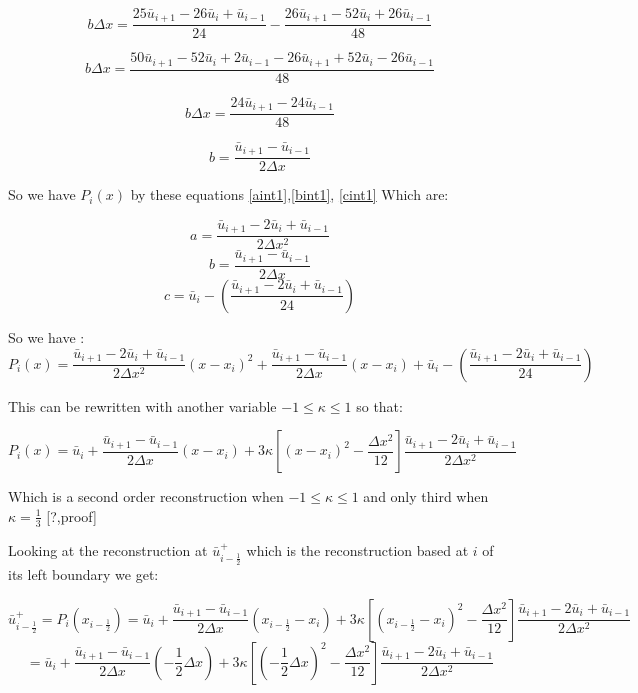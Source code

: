 \documentclass[12pt]{article}
\begin{document}
\begin{dmath*}
 b\Delta x = \frac{25\bar{u}_{i+1} - 26\bar{u}_{i} + \bar{u}_{i-1} }{24} -  \frac{26\bar{u}_{i+1} - 52\bar{u}_{i} + 26\bar{u}_{i-1} }{48}
\end{dmath*}

\begin{dmath*}
 b\Delta x = \frac{50\bar{u}_{i+1} - 52\bar{u}_{i} + 2\bar{u}_{i-1} - 26\bar{u}_{i+1} + 52\bar{u}_{i} - 26\bar{u}_{i-1} }{48}
\end{dmath*}

\begin{dmath*}
 b\Delta x = \frac{24\bar{u}_{i+1} - 24\bar{u}_{i-1}}{48}
\end{dmath*}

\begin{dmath}
\label{bint1}
 b = \frac{\bar{u}_{i+1} - \bar{u}_{i-1}}{2 \Delta x}
\end{dmath}

So we have $P_i(x)$ by these equations \eqref{aint1},\eqref{bint1}, \eqref{cint1} Which are:

\[a = \frac{\bar{u}_{i+1} - 2\bar{u}_{i} + \bar{u}_{i-1} }{2 \Delta x^2}\]
\[ b = \frac{\bar{u}_{i+1} - \bar{u}_{i-1}}{2 \Delta x}\]
\[ c = \bar{u}_i - \left(\frac{\bar{u}_{i+1} - 2\bar{u}_{i} + \bar{u}_{i-1} }{24}\right)\]

So we have :
\[P_i(x) = \frac{\bar{u}_{i+1} - 2\bar{u}_{i} + \bar{u}_{i-1} }{2 \Delta x^2} \left(x - x_i\right)^2 + \frac{\bar{u}_{i+1} - \bar{u}_{i-1}}{2 \Delta x} \left(x - x_i\right) +   \bar{u}_i - \left(\frac{\bar{u}_{i+1} - 2\bar{u}_{i} + \bar{u}_{i-1} }{24}\right)\]

This can be rewritten with another variable $-1  \le \kappa \le 1 $ so that:

\[P_i(x) = \bar{u}_i + \frac{\bar{u}_{i+1} - \bar{u}_{i-1}}{2 \Delta x} \left(x - x_i\right) +  3 \kappa \left[(x - x_i)^2 - \frac{\Delta x^2}{12}\right]\frac{\bar{u}_{i+1} - 2\bar{u}_{i} + \bar{u}_{i-1} }{2 \Delta x^2} \]

Which is a second order reconstruction when $-1  \le \kappa \le 1 $ and only third when $\kappa = \frac{1}{3}$ [?,proof]

Looking at the reconstruction at $\bar{u}^+_{i - \frac{1}{2}}$ which is the reconstruction based at $i$ of its left boundary we get:

\[\bar{u}^+_{i - \frac{1}{2}} = P_i(x_{i-\frac{1}{2}}) = \bar{u}_i + \frac{\bar{u}_{i+1} - \bar{u}_{i-1}}{2 \Delta x} \left(x_{i-\frac{1}{2}} - x_i\right) +  3 \kappa \left[(x_{i-\frac{1}{2}} - x_i)^2 - \frac{\Delta x^2}{12}\right]\frac{\bar{u}_{i+1} - 2\bar{u}_{i} + \bar{u}_{i-1} }{2 \Delta x^2} \]
\[= \bar{u}_i + \frac{\bar{u}_{i+1} - \bar{u}_{i-1}}{2 \Delta x} \left(-\frac{1}{2}\Delta x\right) +  3 \kappa \left[\left(-\frac{1}{2}\Delta x\right)^2 - \frac{\Delta x^2}{12}\right]\frac{\bar{u}_{i+1} - 2\bar{u}_{i} + \bar{u}_{i-1} }{2 \Delta x^2}\]
\end{document}
